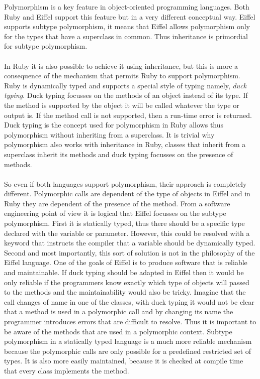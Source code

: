 \documentclass[12pt,a4paper,twocolumn]{article}
\begin{document}
Polymorphism is a key feature in object-oriented programming languages. Both Ruby and Eiffel support this feature but in a very different conceptual way. Eiffel supports subtype polymorphism, it means that Eiffel allows polymorphism only for the types that have a superclass in common. Thus inheritance is primordial for  subtype polymorphism. 
\\
\\ 
In Ruby it is also possible to achieve it using inheritance, but this is more a consequence of the mechanism that permits Ruby to support polymorphism. Ruby is dynamically typed and supports a special style of typing namely, \emph{duck typing}. Duck typing focusses on the methods of an object instead of its type. If the method is supported by the object it will be called whatever the type or output is. If the method call is not supported, then a run-time error is returned. Duck typing is the concept used for polymorphism in Ruby allows thus polymorphism without inheriting from a superclass. It is trivial why polymorphism also works with inheritance in Ruby, classes that inherit from a superclass inherit its methods and duck typing focusses on the presence of methods.
\\
\\
So even if both languages support polymorphism, their approach is completely different. Polymorphic calls are dependent of the type of objects in Eiffel and in Ruby they are dependent of the presence of the method. From a software engineering point of view it is logical that Eiffel focusses on the subtype polymorphism. First it is statically typed, thus there should be a specific type declared with the variable or parameter. However, this could be resolved with a keyword that instructs the compiler that a variable should be dynamically typed. Second and most importantly, this sort of solution is not in the philosophy of the Eiffel language.  One of the goals of Eiffel is to produce software that is reliable and maintainable. If duck typing should be adapted in Eiffel then it would be only reliable if the programmers know exactly which type of objects will passed to the methods and the maintainability would also be tricky. Imagine that the call changes of name in one of the classes, with duck typing it would not be clear that a method is used in a polymorphic call and by changing its name the programmer introduces errors that are difficult to resolve. Thus it is important to be aware of the methods that are used in a polymorphic context. Subtype polymorphism in a statically typed language is a much more reliable mechanism because the polymorphic calls are only possible for a predefined restricted set of types. It is also more easily maintained, because it is checked at compile time that every class implements the method.
\end{document}
